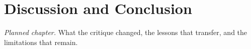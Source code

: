 \chapter{Discussion and Conclusion}
\label{ch:conclusion}


\emph{Planned chapter.} What the critique changed, the lessons that transfer, and the limitations that remain.
